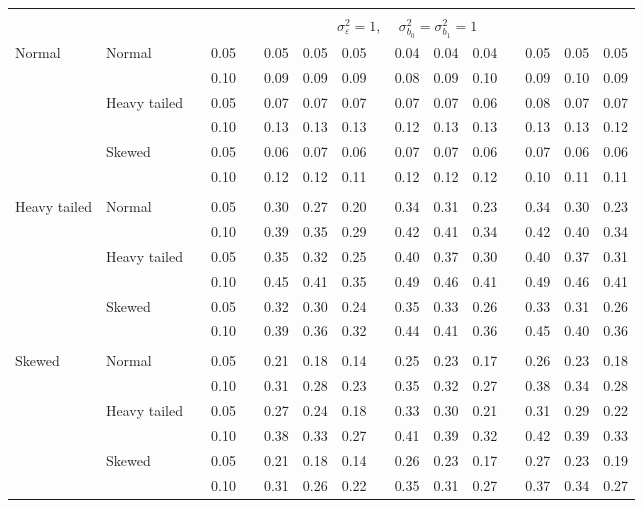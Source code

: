 \documentclass{article} %
\begin{document}
\begin{table}[ht]
\begin{scriptsize}
\begin{center}
\begin{tabular}{ll p{.1cm} c p{.1cm} rrr p{.1cm} rrr p{.1cm} rrr}
&&&&&&&&&&&&&&&\\
& && && \multicolumn{9}{c}{$\sigma_{\varepsilon}^2 = 1$, \ \ $\sigma_{b_0}^2 = \sigma_{b_1}^2 = 1$} \\ \cline{6-16}
\rowcolor{gray!20}Normal       & Normal       && 0.05 &&   0.05 & 0.05 & 0.05 && 0.04 & 0.04 & 0.04 &&  0.05 & 0.05 & 0.05 \\ 
\rowcolor{gray!20}             &              && 0.10 &&   0.09 & 0.09 & 0.09 && 0.08 & 0.09 & 0.10 &&  0.09 & 0.10 & 0.09 \\ 
\rowcolor{gray!20}             & Heavy tailed && 0.05 &&   0.07 & 0.07 & 0.07 && 0.07 & 0.07 & 0.06 &&  0.08 & 0.07 & 0.07 \\ 
\rowcolor{gray!20}             &              && 0.10 &&   0.13 & 0.13 & 0.13 && 0.12 & 0.13 & 0.13 &&  0.13 & 0.13 & 0.12 \\ 
\rowcolor{gray!20}             & Skewed       && 0.05 &&   0.06 & 0.07 & 0.06 && 0.07 & 0.07 & 0.06 &&  0.07 & 0.06 & 0.06 \\ 
\rowcolor{gray!20}             &              && 0.10 &&   0.12 & 0.12 & 0.11 && 0.12 & 0.12 & 0.12 &&  0.10 & 0.11 & 0.11 \\ 
             &&&&&&&&&&&&&&&\\
Heavy tailed & Normal       && 0.05 &&   0.30 & 0.27 & 0.20 && 0.34 & 0.31 & 0.23 && 0.34 & 0.30 & 0.23 \\
             &              && 0.10 &&   0.39 & 0.35 & 0.29 && 0.42 & 0.41 & 0.34 && 0.42 & 0.40 & 0.34 \\ 
             & Heavy tailed && 0.05 &&   0.35 & 0.32 & 0.25 && 0.40 & 0.37 & 0.30 && 0.40 & 0.37 & 0.31 \\ 
             &              && 0.10 &&   0.45 & 0.41 & 0.35 && 0.49 & 0.46 & 0.41 && 0.49 & 0.46 & 0.41 \\ 
             & Skewed       && 0.05 &&   0.32 & 0.30 & 0.24 && 0.35 & 0.33 & 0.26 && 0.33 & 0.31 & 0.26 \\ 
             &              && 0.10 &&   0.39 & 0.36 & 0.32 && 0.44 & 0.41 & 0.36 && 0.45 & 0.40 & 0.36 \\ 
             &&&&&&&&&&&&&&&\\
Skewed       & Normal       && 0.05 &&   0.21 & 0.18 & 0.14 && 0.25 & 0.23 & 0.17 &&  0.26 & 0.23 & 0.18 \\ 
             &              && 0.10 &&   0.31 & 0.28 & 0.23 && 0.35 & 0.32 & 0.27 &&  0.38 & 0.34 & 0.28 \\ 
             & Heavy tailed && 0.05 &&   0.27 & 0.24 & 0.18 && 0.33 & 0.30 & 0.21 &&  0.31 & 0.29 & 0.22 \\ 
             &              && 0.10 &&   0.38 & 0.33 & 0.27 && 0.41 & 0.39 & 0.32 &&  0.42 & 0.39 & 0.33 \\ 
             & Skewed       && 0.05 &&   0.21 & 0.18 & 0.14 && 0.26 & 0.23 & 0.17 &&  0.27 & 0.23 & 0.19 \\ 
             &              && 0.10 &&   0.31 & 0.26 & 0.22 && 0.35 & 0.31 & 0.27 &&  0.37 & 0.34 & 0.27 \\ 


\end{tabular}
\end{center}
\end{scriptsize}
\end{table}
\end{document}
